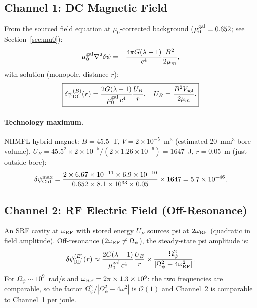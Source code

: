 \documentclass[11pt,twocolumn]{article}
\newcommand{\dpsi}{\delta\psi}
\newcommand{\lam}{\lambda}
\newcommand{\Opsi}{\Omega_\psi}
\newcommand{\order}[1]{\mathcal{O}(#1)}
\begin{document}
\subsection{Channel 1: DC Magnetic Field}

From the sourced field equation at $\mu_0$-corrected background
($\mu_0^{\rm gal} = 0.652$; see Section~\ref{sec:mu0}):
\begin{equation}
\mu_0^{\rm gal}\nabla^2\dpsi
= -\frac{4\pi G(\lam-1)}{c^4}\frac{B^2}{2\mu_m},
\end{equation}
with solution (monopole, distance $r$):
\begin{equation}
\boxed{
\dpsi_{\rm DC}^{(B)}(r) = \frac{2G(\lam-1)}{\mu_0^{\rm gal}\,c^4}
\frac{U_B}{r},
\quad U_B = \frac{B^2 V_{\rm sol}}{2\mu_m}.
}
\label{eq:ch1_exact}
\end{equation}

\paragraph{Technology maximum.} NHMFL hybrid magnet: $B = 45.5$~T,
$V = 2\times10^{-5}$~m$^3$ (estimated 20~mm$^3$ bore volume),
$U_B = 45.5^2\times2\times10^{-5}/(2\times1.26\times10^{-6}) = 1647$~J,
$r = 0.05$~m (just outside bore):
\begin{equation}
\dpsi_{\rm Ch1}^{\rm max} = \frac{2\times6.67\times10^{-11}\times6.9\times10^{-10}}
{0.652\times8.1\times10^{33}\times0.05}\times1647
= 5.7\times10^{-46}.
\end{equation}

\subsection{Channel 2: RF Electric Field (Off-Resonance)}

An SRF cavity at $\omega_{\rm RF}$ with stored energy $U_E$ sources psi
at $2\omega_{\rm RF}$ (quadratic in field amplitude). Off-resonance
($2\omega_{\rm RF} \neq \Opsi$), the steady-state psi amplitude is:
\begin{equation}
\dpsi_{\rm RF}^{(E)}(r) \approx \frac{2G(\lam-1)}{\mu_0^{\rm gal}\,c^4}
\frac{U_E}{r}\times\frac{\Opsi^2}{|\Opsi^2 - 4\omega_{\rm RF}^2|}.
\label{eq:ch2_offresonance}
\end{equation}
For $\Opsi \sim 10^9$~rad/s and $\omega_{\rm RF} = 2\pi\times1.3\times10^9$:
the two frequencies are comparable, so the factor $\Opsi^2/|\Opsi^2-4\omega^2|$
is $\order{1}$ and Channel~2 is comparable to Channel~1 per joule.
\end{document}
